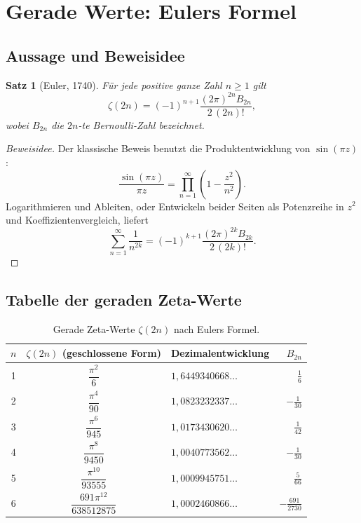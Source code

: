 \documentclass[12pt,a4paper]{amsart}
\newtheorem{theorem}{Satz}[section]
\theoremstyle{definition}
\theoremstyle{remark}
\begin{document}
\section{Gerade Werte: Eulers Formel}

\subsection{Aussage und Beweisidee}

\begin{theorem}[Euler, 1740]
  Für jede positive ganze Zahl $n \geq 1$ gilt
  \[
    \zeta(2n) = (-1)^{n+1} \frac{(2\pi)^{2n} B_{2n}}{2\,(2n)!},
  \]
  wobei $B_{2n}$ die $2n$-te Bernoulli-Zahl bezeichnet.
\end{theorem}

\begin{proof}[Beweisidee]
  Der klassische Beweis benutzt die Produktentwicklung von $\sin(\pi z)$:
  \[
    \frac{\sin(\pi z)}{\pi z} = \prod_{n=1}^{\infty} \left(1 - \frac{z^2}{n^2}\right).
  \]
  Logarithmieren und Ableiten, oder Entwickeln beider Seiten als Potenzreihe in
  $z^2$ und Koeffizientenvergleich, liefert
  \[
    \sum_{n=1}^{\infty} \frac{1}{n^{2k}} = (-1)^{k+1} \frac{(2\pi)^{2k}
    B_{2k}}{2\,(2k)!}.
  \]
\end{proof}

\subsection{Tabelle der geraden Zeta-Werte}

\begin{table}[h]
  \centering
  \caption{Gerade Zeta-Werte $\zeta(2n)$ nach Eulers Formel.}
  \vspace{4pt}
  \begin{tabular}{@{}cclr@{}}
    \toprule
    $n$ & $\zeta(2n)$ (geschlossene Form) & Dezimalentwicklung & $B_{2n}$ \\
    \midrule
    1 & $\dfrac{\pi^2}{6}$           & $1{,}6449340668\ldots$ & $\tfrac{1}{6}$     \\[6pt]
    2 & $\dfrac{\pi^4}{90}$          & $1{,}0823232337\ldots$ & $-\tfrac{1}{30}$   \\[6pt]
    3 & $\dfrac{\pi^6}{945}$         & $1{,}0173430620\ldots$ & $\tfrac{1}{42}$    \\[6pt]
    4 & $\dfrac{\pi^8}{9450}$        & $1{,}0040773562\ldots$ & $-\tfrac{1}{30}$   \\[6pt]
    5 & $\dfrac{\pi^{10}}{93555}$    & $1{,}0009945751\ldots$ & $\tfrac{5}{66}$    \\[6pt]
    6 & $\dfrac{691\pi^{12}}{638512875}$ & $1{,}0002460866\ldots$ & $-\tfrac{691}{2730}$ \\
    \bottomrule
  \end{tabular}
  \label{tab:gerade-zeta}
\end{table}
\end{document}
